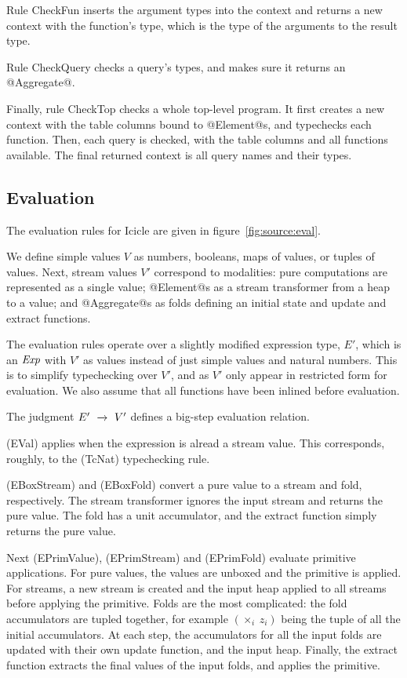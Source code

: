 Rule CheckFun inserts the argument types into the context and returns a new context with the function's type, which is the type of the arguments to the result type.

Rule CheckQuery checks a query's types, and makes sure it returns an @Aggregate@.

Finally, rule CheckTop checks a whole top-level program.
It first creates a new context with the table columns bound to @Element@s, and typechecks each function.
Then, each query is checked, with the table columns and all functions available.
The final returned context is all query names and their types.

\subsection{Evaluation}

The evaluation rules for Icicle are given in figure~\ref{fig:source:eval}.

We define simple values $V$ as numbers, booleans, maps of values, or tuples of values.
Next, stream values $V'$ correspond to modalities: pure computations are represented as a single value;
@Element@s as a stream transformer from a heap to a value;
and @Aggregate@s as folds defining an initial state and update and extract functions.

The evaluation rules operate over a slightly modified expression type, $E'$, which is an $\mathit{Exp}$ with $V'$ as values instead of just simple values and natural numbers.
This is to simplify typechecking over $V'$, and as $V'$ only appear in restricted form for evaluation.
We also assume that all functions have been inlined before evaluation.

The judgment $E' ~\xrightarrow~~ V'$ defines a big-step evaluation relation.

(EVal) applies when the expression is alread a stream value.
This corresponds, roughly, to the (TcNat) typechecking rule.

(EBoxStream) and (EBoxFold) convert a pure value to a stream and fold, respectively.
The stream transformer ignores the input stream and returns the pure value.
The fold has a unit accumulator, and the extract function simply returns the pure value.

Next (EPrimValue), (EPrimStream) and (EPrimFold) evaluate primitive applications.
For pure values, the values are unboxed and the primitive is applied.
For streams, a new stream is created and the input heap applied to all streams before applying the primitive.
Folds are the most complicated: the fold accumulators are tupled together, for example $(\times_i~z_i)$ being the tuple of all the initial accumulators.
At each step, the accumulators for all the input folds are updated with their own update function, and the input heap.
Finally, the extract function extracts the final values of the input folds, and applies the primitive.

